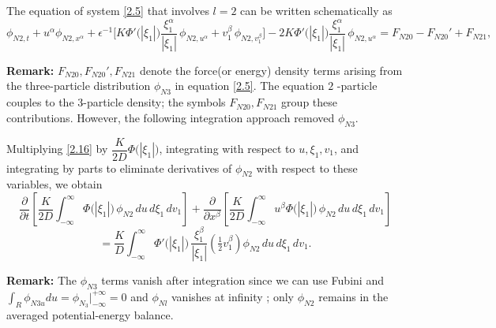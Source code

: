 \documentclass[11pt]{article}
\begin{document}
The equation of system \eqref{2.5} that involves $l=2$ can be written schematically as
\begin{equation*}\label{2.16}
\phi_{N2,t}+u^\alpha\phi_{N2,x^\alpha}
+\epsilon^{-1}\Big[
K\Phi'\big(|\xi_1|\big)\frac{\xi_1^\alpha}{|\xi_1|}\,\phi_{N2,u^\alpha}
+v_1^\beta\,\phi_{N2,v_1^\beta}
\Big]
-2K\Phi'\big(|\xi_1|\big)\frac{\xi_1^\alpha}{|\xi_1|}\,\phi_{N2,u^\alpha}
=
F_{N20}-F_{N20}' + F_{N21},
\tag{2.16}
\end{equation*}

\textbf{Remark:} $F_{N20},F_{N20}',F_{N21}$ denote the force(or energy) density terms arising from the three-particle distribution $\phi_{N3}$ in equation \eqref{2.5}. The equation $2$ -particle couples to the $3$-particle density; the symbols $F_{N20},F_{N21}$ group these contributions. However, the following integration approach removed $\phi_{N3}$.

Multiplying \eqref{2.16} by $\dfrac{K}{2D}\Phi\big(|\xi_1|\big)$, integrating with respect to $u,\xi_1,v_1$, and integrating by parts to eliminate derivatives of $\phi_{N2}$ with respect to these variables, we obtain
\begin{equation*}\label{2.17}
\frac{\partial}{\partial t}
\left[
\frac{K}{2D}\int_{-\infty}^{\infty}\Phi\big(|\xi_1|\big)\,\phi_{N2}\,du\,d\xi_1\,dv_1
\right]
+
\frac{\partial}{\partial x^\beta}
\left[
\frac{K}{2D}\int_{-\infty}^{\infty}u^\beta \Phi\big(|\xi_1|\big)\,\phi_{N2}\,du\,d\xi_1\,dv_1
\right]
\tag{2.17}
\end{equation*}
\[
=
\frac{K}{D}
\int_{-\infty}^{\infty}
\Phi'\big(|\xi_1|\big)\,\frac{\xi_1^\beta}{|\xi_1|}
\left(\tfrac12 v_1^\beta\right)
\phi_{N2}\,du\,d\xi_1\,dv_1.
\]

\textbf{Remark:} The $\phi_{N3}$ terms vanish after integration since we can use Fubini and $\int_R\phi_{N3u}du=\phi_{N_3}|_{-\infty}^{+\infty}=0$ and $\phi_{Nl}$ vanishes at infinity ; only $\phi_{N2}$ remains in the averaged potential-energy balance.
\end{document}

